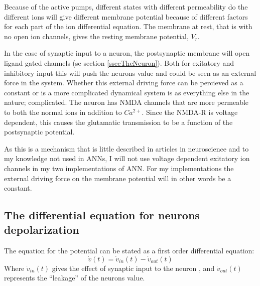 
Because of the active pumps, different states with different permeability do the different ions will give different membrane potential because of different factors for each part of the ion differential equation. 
The membrane at rest, that is with no open ion channels, gives the resting membrane potential, $V_r$. 

In the case of synaptic input to a neuron, the postsynaptic membrane will open ligand gated channels (se section \ref{ssecTheNeuron}). 
Both for exitatory and inhibitory input this will push the neurons value and could be seen as an external force in the system.
Whether this external driving force can be percieved as a constant or is a more complicated dynamical system is as everything else in the nature; complicated. %
The neuron has NMDA channels that are more permeable to both the normal ions in addition to $Ca^{2+}$. Since the NMDA-R is voltage dependent, this causes the glutamatic transmission to be a function of the postsynaptic potential.

As this is a mechanism that is little described in articles in neuroscience and to my knowledge not used in ANNs, I will not use voltage dependent exitatory ion channels in my two implementations of ANN. 
For my implementations the external driving force on the membrane potential will in other words be a constant.



\subsection{The differential equation for neurons depolarization} %
The equation for the potential can be stated as a first order differential equation:
\begin{equation}
	\dot{v}(t) = \dot{v}_{in}(t) - \dot{v}_{out}(t) %
\end{equation}
Where $\dot{v}_{in}(t)$ gives the effect of synaptic input to the neuron%
	, and $\dot{v}_{out}(t)$ represents the ``leakage'' of the neurons value.



